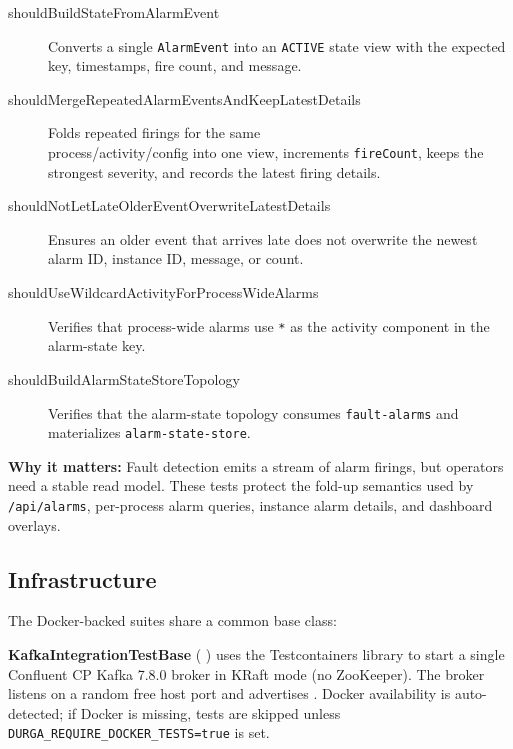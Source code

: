 \begin{description}

\item[shouldBuildStateFromAlarmEvent] Converts a single \texttt{AlarmEvent} into
an \texttt{ACTIVE} state view with the expected key, timestamps, fire count, and
message.

\item[shouldMergeRepeatedAlarmEventsAndKeepLatestDetails] Folds repeated firings
for the same \\ process/activity/config into one view, increments \texttt{fireCount},
keeps the strongest severity, and records the latest firing details.

\item[shouldNotLetLateOlderEventOverwriteLatestDetails] Ensures an older event
that arrives late does not overwrite the newest alarm ID, instance ID, message,
or count.

\item[shouldUseWildcardActivityForProcessWideAlarms] Verifies that process-wide
alarms use \texttt{*} as the activity component in the alarm-state key.

\item[shouldBuildAlarmStateStoreTopology] Verifies that the alarm-state topology
consumes \texttt{fault-alarms} and materializes \texttt{alarm-state-store}.

\end{description}

\textbf{Why it matters:} Fault detection emits a stream of alarm firings, but
operators need a stable read model. These tests protect the fold-up semantics
used by \texttt{/api/alarms}, per-process alarm queries, instance alarm details,
and dashboard overlays.


\subsection{Infrastructure}

The Docker-backed suites share a common base class:

\textbf{KafkaIntegrationTestBase} (
) uses the Testcontainers
library to start a single Confluent CP Kafka 7.8.0 broker in KRaft mode
(no ZooKeeper). The broker listens on a random free host port and
advertises . Docker availability is
auto-detected; if Docker is missing, tests are skipped unless \\
\texttt{DURGA\_REQUIRE\_DOCKER\_TESTS=true} is set.

